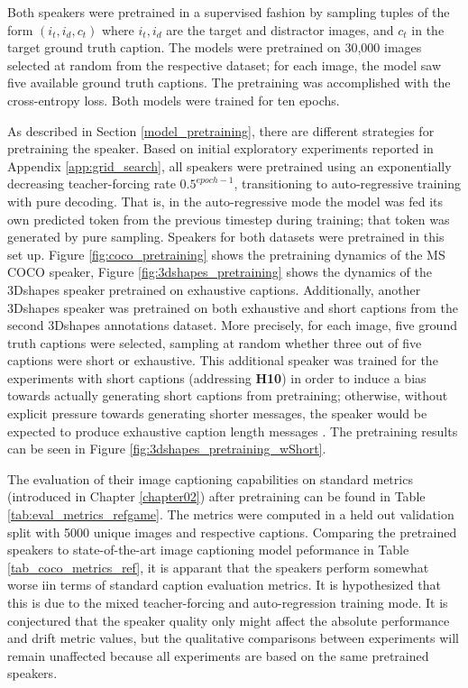 Both speakers were pretrained in a supervised fashion by sampling tuples of the form $(i_t, i_d, c_t)$ where $i_t, i_d$ are the target and distractor images, and $c_t$ in the target ground truth caption. The models were pretrained on 30,000 images selected at random from the respective dataset; for each image, the model saw five available ground truth captions. 
The pretraining was accomplished with the cross-entropy loss. Both models were trained for ten epochs.

As described in Section \ref{model_pretraining}, there are different strategies for pretraining the speaker. Based on initial exploratory experiments reported in Appendix \ref{app:grid_search}, all speakers were pretrained using an exponentially decreasing teacher-forcing rate $0.5^{epoch-1}$, transitioning to auto-regressive training with pure decoding. That is, in the auto-regressive mode the model was fed its own predicted token from the previous timestep during training; that token was generated by pure sampling. Speakers for both datasets were pretrained in this set up. Figure \ref{fig:coco_pretraining} shows the pretraining dynamics of the MS COCO speaker, Figure \ref{fig:3dshapes_pretraining} shows the dynamics of the 3Dshapes speaker pretrained on exhaustive captions. Additionally, another 3Dshapes speaker was pretrained on both exhaustive and short captions from the second 3Dshapes annotations dataset. More precisely, for each image, five ground truth captions were selected, sampling at random whether three out of five captions were short or exhaustive. This additional speaker was trained for the experiments with short captions (addressing \textbf{H10}) in order to induce a bias towards actually generating short captions from pretraining; otherwise, without explicit pressure towards generating shorter messages, the speaker would be expected to produce exhaustive caption length messages \parencite[cf., e.~g.,][]{hupkes2020compositionality}. The pretraining results can be seen in Figure \ref{fig:3dshapes_pretraining_wShort}.

The evaluation of their image captioning capabilities on standard metrics (introduced in Chapter \ref{chapter02}) after pretraining can be found in Table \ref{tab:eval_metrics_refgame}. The metrics were computed in a held out validation split with 5000 unique images and respective captions. Comparing the pretrained speakers to state-of-the-art image captioning model peformance in Table \ref{tab_coco_metrics_ref}, it is apparant that the speakers perform somewhat worse iin terms of standard caption evaluation metrics. It is hypothesized that this is due to the mixed teacher-forcing and auto-regression training mode. It is conjectured that the speaker quality only might affect the absolute performance and drift metric values, but the qualitative comparisons between experiments will remain unaffected because all experiments are based on the same pretrained speakers.

